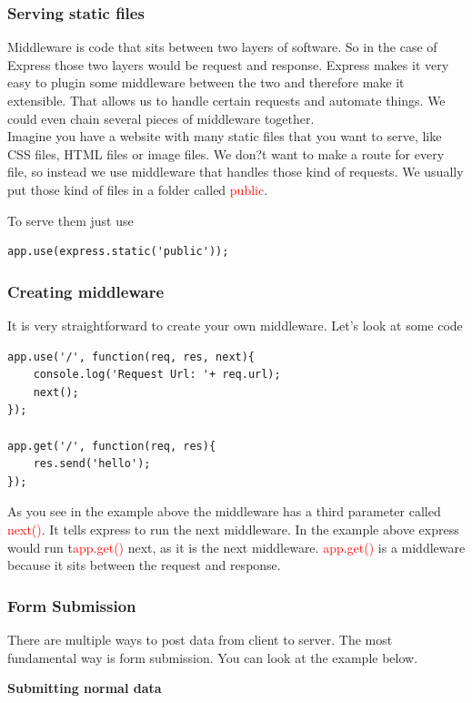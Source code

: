\documentclass[a4paper]{article}
\begin{document}
\subsubsection{Serving static files}
Middleware is code that sits between two layers of software. So in the case of Express those two layers would be request and response. Express makes it very easy to plugin some middleware between the two and therefore make it extensible. That allows us to handle certain requests and automate things. We could even chain several pieces of middleware together.\\

Imagine you have a website with many static files that you want to serve, like CSS files, HTML files or image files. We don?t want to make a route for every file, so instead we use middleware that handles those kind of requests. We usually put those kind of files in a folder called \textcolor{red}{public}.

To serve them just use
\begin{lstlisting}
app.use(express.static('public'));
\end{lstlisting}
\subsubsection{Creating middleware}
It is very straightforward to create your own middleware. Let's look at some code
\begin{lstlisting}
app.use('/', function(req, res, next){
    console.log('Request Url: '+ req.url);
    next();
});

app.get('/', function(req, res){
    res.send('hello');
});
\end{lstlisting}
As you see in the example above the middleware has a third parameter called  \textcolor{red}{next()}. It tells express to run the next middleware. In the example above express would run t\textcolor{red}{app.get()} next, as it is the next middleware. \textcolor{red}{app.get()} is a middleware because it sits between the request and response.
\subsubsection{Form Submission}
There are multiple ways to post data from client to server. The most fundamental way is form submission. You can look at the example below.


\textbf{Submitting normal data}\\
\end{document}
